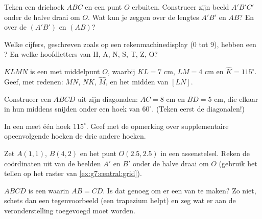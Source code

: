 \begin{exercise}[$\star$]\label{exo:g7:central:2}
Teken een driehoek $ABC$ en een punt $O$ erbuiten. Construeer zijn beeld $A'B'C'$
onder de halve draai om $O$. Wat kun je zeggen over de lengtes $A'B'$ en $AB$? En
over de  $(A'B')$ en $(AB)$?
\end{exercise}

\begin{exercise}[$\star$]\label{exo:g7:central:3}
Welke cijfers, geschreven zoals op een rekenmachinedisplay ($0$ tot $9$), hebben een
? En welke hoofdletters van H, A, N, S, T, Z, O?
\end{exercise}

\begin{exercise}[$\star$]\label{exo:g7:central:4}
$KLMN$ is een  met middelpunt $O$, waarbij $KL = 7$ cm, $LM = 4$ cm en
$\widehat K = 115^\circ$. Geef, met redenen: $MN$, $NK$, $\widehat M$, en het midden
van $[LN]$.
\end{exercise}

\begin{exercise}[$\star$]\label{exo:g7:central:5}
Construeer een  $ABCD$ uit zijn diagonalen: $AC = 8$ cm en
$BD = 5$ cm, die elkaar in hun middens snijden onder een hoek van $60^\circ$. (Teken
eerst de diagonalen!)
\end{exercise}

\begin{exercise}[$\star$]\label{exo:g7:central:6}
In een  meet één hoek $115^\circ$. Geef met de opmerking over
supplementaire opeenvolgende hoeken de drie andere hoeken.
\end{exercise}

\begin{exercise}[$\star\star$]\label{exo:g7:central:7}
Zet $A(1, 1)$, $B(4, 2)$ en het punt $O(2.5, 2.5)$ in een assenstelsel. Reken de
coördinaten uit van de beelden $A'$ en $B'$ onder de halve draai om $O$ (gebruik het
tellen op het raster van \cref{ex:g7:central:grid}).
\end{exercise}

\begin{exercise}[$\star\star$]\label{exo:g7:central:8}
$ABCD$ is een  waarin $AB = CD$. Is dat genoeg om er een  van
te maken? Zo niet, schets dan een tegenvoorbeeld (een  trapezium helpt) en
zeg wat er aan de veronderstelling toegevoegd moet worden.
\end{exercise}

